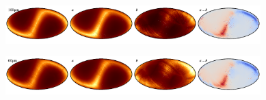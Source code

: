\documentclass{aa}
\begin{document}
\begin{figure}
    \includegraphics[width=0.22\textwidth]{figs/zodi/zodi_08_tot.pdf}\includegraphics[width=0.22\textwidth]{figs/zodi/zodi_08_a.pdf}\includegraphics[width=0.22\textwidth]{figs/zodi/zodi_03_b.pdf}\includegraphics[width=0.22\textwidth]{figs/zodi/zodi_08_a-b.pdf}
    \vspace{-0.3cm}

    \includegraphics[width=0.22\textwidth]{figs/zodi/zodi_07_tot.pdf}\includegraphics[width=0.22\textwidth]{figs/zodi/zodi_07_a.pdf}\includegraphics[width=0.22\textwidth]{figs/zodi/zodi_04_b.pdf}\includegraphics[width=0.22\textwidth]{figs/zodi/zodi_07_a-b.pdf}
    \vspace{-0.3cm}


\end{figure}
\end{document}
